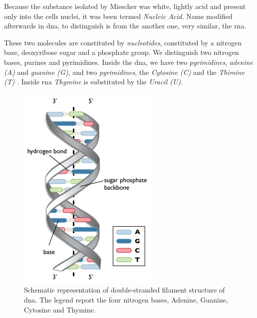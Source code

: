 Because the substance isolated by Miescher was white, lightly acid and present only into the cells nuclei, it was been termed \textit{Nucleic Acid}.
Name modified afterwards in \gls{dna}, to distinguish is from the another one, very similar, the \gls{rna}.

These two molecules are constituted by \textit{nucleotides}, constituted by a nitrogen base, deoxyribose sugar and a phosphate group.
We distinguish two nitrogen bases, purines and pyrimidines.
Inside the \gls{dna}, we have two \textit{pyrimidines}, \textit{adenine (A)} and \textit{guanine (G)}, and two \textit{pyrimidines}, the \textit{Cytosine (C)} and the \textit{Thimine (T)}  .
Inside \gls{rna} \textit{Thymine} is substituted by the \textit{Uracil (U)}.

\begin{figure}[H]
\centering
\includegraphics[width=\textwidth, keepaspectratio]{img/intro/dna1.png}
\caption[the \gls{dna}]{Schematic representation of double-stranded filament structure of \gls{dna}. The legend report the four nitrogen bases, Adenine, Guanine, Cytosine and Thymine.}
\label{fig:dna}
\end{figure}

